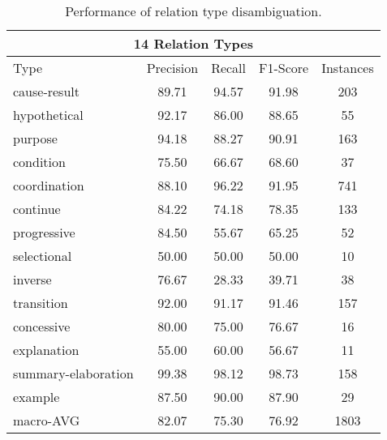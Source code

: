 \begin{table}[ht]
\begin{tabular}{|l|c|c|c|c|}
\multicolumn{5}{|c|}{14 Relation Types}                                             \\ \hline
    Type                &     Precision &     Recall &     F1-Score &     Instances \\ \hline
    cause-result        &     89.71     &     94.57  &     91.98    &     203       \\ \hline
    hypothetical        &     92.17     &     86.00  &     88.65    &     55        \\ \hline
    purpose             &     94.18     &     88.27  &     90.91    &     163       \\ \hline
    condition           &     75.50     &     66.67  &     68.60    &     37        \\ \hline
    coordination        &     88.10     &     96.22  &     91.95    &     741       \\ \hline
    continue            &     84.22     &     74.18  &     78.35    &     133       \\ \hline
    progressive         &     84.50     &     55.67  &     65.25    &     52        \\ \hline
    selectional         &     50.00     &     50.00  &     50.00    &     10        \\ \hline
    inverse             &     76.67     &     28.33  &     39.71    &     38        \\ \hline
    transition          &     92.00     &     91.17  &     91.46    &     157       \\ \hline
    concessive          &     80.00     &     75.00  &     76.67    &     16        \\ \hline
    explanation         &     55.00     &     60.00  &     56.67    &     11        \\ \hline
    summary-elaboration &     99.38     &     98.12  &     98.73    &     158       \\ \hline
    example             &     87.50     &     90.00  &     87.90    &     29        \\ \hline
    macro-AVG           &     82.07     &     75.30  &     76.92    &     1803      \\ \hline

\end{tabular}
\caption{\label{t:sense-types} Performance of relation type
disambiguation. }
\end{table}
